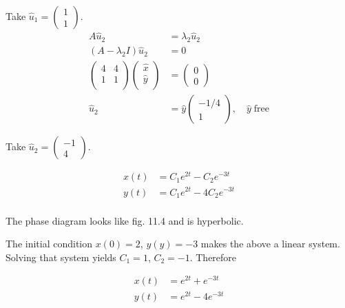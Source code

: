 \documentclass[12pt]{article}
\begin{document}
Take $\hat{u}_1=\begin{pmatrix} 1 \\ 1 \end{pmatrix}$.
\begin{equation}
  \begin{aligned}
    A\hat{u}_2 &= \lambda_2\hat{u}_2 \\
    (A-\lambda_2I)\hat{u}_2 &= 0 \\
    \begin{pmatrix}
      4 & 4 \\ 1 & 1 \\
    \end{pmatrix}
    \begin{pmatrix}
      \hat{x} \\ \hat{y} \\
    \end{pmatrix} &=
    \begin{pmatrix}
      0 \\ 0
    \end{pmatrix} \\
    \hat{u}_2 &= \hat{y}
    \begin{pmatrix}
      -1/4 \\ 1
    \end{pmatrix}, \quad \hat{y}\;\text{free}
  \end{aligned}
\end{equation}

Take $\hat{u}_2=\begin{pmatrix} -1 \\ 4 \end{pmatrix}$.

\begin{equation}
  \begin{aligned}
    x(t) &= C_1e^{2t}-C_2e^{-3t} \\
    y(t) &= C_1e^{2t}-4C_2e^{-3t} \\
  \end{aligned}
\end{equation}

The phase diagram looks like fig. 11.4 and is hyperbolic.

The initial condition $x(0)=2$, $y(y)=-3$ makes the above a linear system.
Solving that system yields $C_1=1$, $C_2=-1$. Therefore

\begin{equation}
  \begin{aligned}
    x(t) &= e^{2t}+e^{-3t} \\
    y(t) &= e^{2t}-4e^{-3t} \\
  \end{aligned}
\end{equation}
\end{document}
